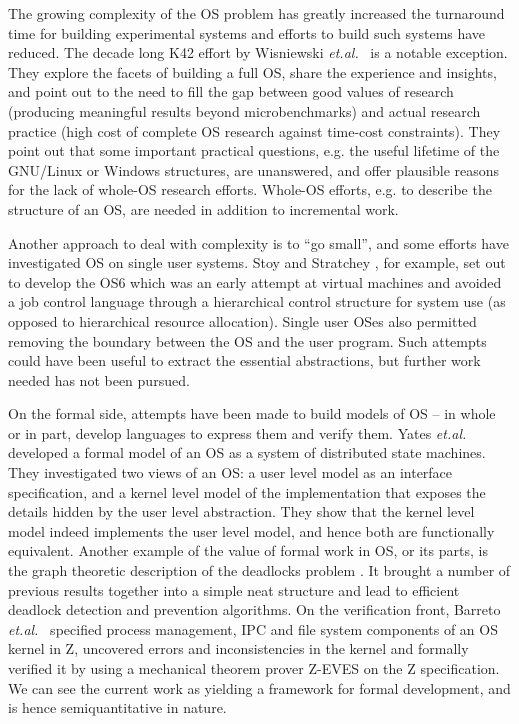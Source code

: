 \documentclass[draft]{article}
\def\etal{{\it et.al.}\ }
\begin{document}
The growing  complexity of  the OS problem  has greatly  increased the
turnaround time for building experimental systems and efforts to build
such systems have  reduced.  The decade long K42  effort by Wisniewski
\etal   \cite{Wisniewski:2008:KLO:1341312.1341316}    is   a   notable
exception. They  explore the facets of  building a full  OS, share the
experience and  insights, and point  out to the  need to fill  the gap
between good  values of research (producing  meaningful results beyond
microbenchmarks) and  actual research practice (high  cost of complete
OS research against time-cost  constraints).  They point out that some
important  practical  questions,  e.g.   the useful  lifetime  of  the
GNU/Linux or  Windows structures, are unanswered,  and offer plausible
reasons for the lack  of whole-OS research efforts.  Whole-OS efforts,
e.g. to  describe the structure  of an OS,  are needed in  addition to
incremental work.

Another approach to deal with  complexity is to ``go small'', and some
efforts  have  investigated  OS  on  single user  systems.   Stoy  and
Stratchey \cite{stoy:strachey:os6:1,stoy:strachey:os6:2}, for example,
set  out to  develop the  OS6 which  was an  early attempt  at virtual
machines  and avoided a  job control  language through  a hierarchical
control structure for system  use (as opposed to hierarchical resource
allocation).  Single  user OSes  also permitted removing  the boundary
between       the      OS       and       the      user       program.
\cite{Ranai:1986:DRS:382158.383030}  Such  attempts  could  have  been
useful to extract the  essential abstractions, but further work needed
has not been pursued.

On the formal  side, attempts have been made to build  models of OS --
in  whole or in  part, develop  languages to  express them  and verify
them.  Yates \etal \cite{Yates99i/oautomaton} developed a formal model
of an OS as a  system of distributed state machines. They investigated
two views of an OS: a  user level model as an interface specification,
and  a kernel  level  model  of the  implementation  that exposes  the
details  hidden by  the user  level abstraction.   They show  that the
kernel level model  indeed implements the user level  model, and hence
both  are functionally equivalent.   Another example  of the  value of
formal work in OS, or its parts, is the graph theoretic description of
the deadlocks  problem \cite{Holt:1972:DPC:356603.356607}.  It brought
a number of previous results together into a simple neat structure and
lead to  efficient deadlock  detection and prevention  algorithms.  On
the         verification          front,         Barreto         \etal
\cite{Barreto:2011:ASF:1945023.1945042}  specified process management,
IPC and file system components of  an OS kernel in Z, uncovered errors
and inconsistencies in the kernel  and formally verified it by using a
mechanical theorem prover  Z-EVES on the Z specification.   We can see
the current work  as yielding a framework for  formal development, and
is hence semiquantitative in nature.
\end{document}
